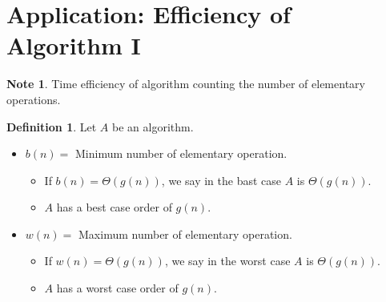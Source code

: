 \documentclass[12pt,openany]{book}
\theoremstyle{definition}
\newtheorem{definition}{Definition}[chapter]
\newtheorem*{note}{Note}
\begin{document}
	\section{Application: Efficiency of Algorithm I}
	\begin{note}
		Time efficiency of algorithm counting the number of elementary operations. 
	\end{note}
	\vspace{20pt}
	\begin{tcolorbox}[colframe=defcolor,title={\color{white}\bf }]
		\begin{definition}
			Let $A$ be an algorithm.
			\begin{itemize}
				\item $b(n)=$ Minimum number of elementary operation.
				\begin{itemize}
					\item If $b(n)=\Theta(g(n))$, we say in the bast case $A$ is $\Theta(g(n))$.
					\item $A$ has a best case order of $g(n)$.
				\end{itemize}
				\item $w(n)=$ Maximum number of elementary operation.
				\begin{itemize}
					\item If $w(n)=\Theta(g(n))$, we say in the worst case $A$ is $\Theta(g(n))$.
					\item $A$ has a worst case order of $g(n)$.
				\end{itemize}
			\end{itemize}
		\end{definition}
	\end{tcolorbox}
	\vspace{10pt}
\end{document}
